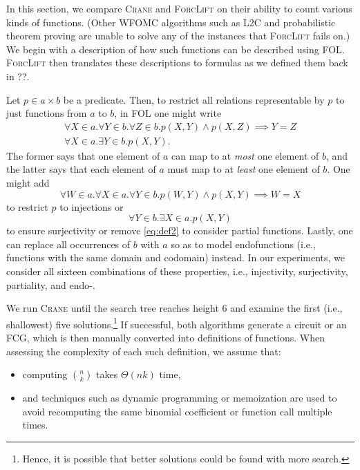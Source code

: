 In this section, we compare \textsc{Crane} and \textsc{ForcLift}
\citep{DBLP:conf/ijcai/BroeckTMDR11} on their ability to count various kinds of
functions. (Other WFOMC algorithms such as \textsc{L2C}
\citep{DBLP:conf/kr/KazemiP16} and probabilistic theorem proving
\citep{DBLP:journals/cacm/GogateD16} are unable to solve any of the instances
that \textsc{ForcLift} fails on.) We begin with a description of how such
functions can be described using FOL\@. \textsc{ForcLift} then translates these
descriptions to formulas as we defined them back in ??.

Let $p \in a \times b$ be a predicate. Then, to restrict all relations
representable by $p$ to just functions from $a$ to $b$, in FOL one might write
\begin{gather}
  \forall X \in a. \forall Y \in b. \forall Z \in b. p(X, Y) \land p(X, Z) \implies Y = Z\nonumber \\
  \forall X \in a. \exists Y \in b. p(X, Y). \label{eq:def2}
\end{gather}
The former says that one element of $a$ can map to at \emph{most} one element of
$b$, and the latter says that each element of $a$ must map to at \emph{least}
one element of $b$. One might add
\[
  \forall W \in a. \forall X \in a. \forall Y \in b. p(W, Y) \land p(X, Y) \implies W = X
\]
to restrict $p$ to injections or
\[
  \forall Y \in b. \exists X \in a. p(X, Y)
\]
to ensure surjectivity or remove \cref{eq:def2} to consider partial functions.
Lastly, one can replace all occurrences of $b$ with $a$ so as to model
endofunctions (i.e., functions with the same domain and codomain) instead. In
our experiments, we consider all sixteen combinations of these properties, i.e.,
injectivity, surjectivity, partiality, and endo-.

We run \textsc{Crane} until the search tree reaches height 6 and examine the
first (i.e., shallowest) five solutions.\footnote{Hence, it is possible that
  better solutions could be found with more search.} If successful, both
algorithms generate a circuit or an FCG, which is then manually converted into
definitions of functions. When assessing the complexity of each such definition,
we assume that:
\begin{itemize}
  \item computing $\binom{n}{k}$ takes $\Theta(nk)$ time,
  \item and techniques such as dynamic programming or memoization are used to
        avoid recomputing the same binomial coefficient or function call
        multiple times.
\end{itemize}

